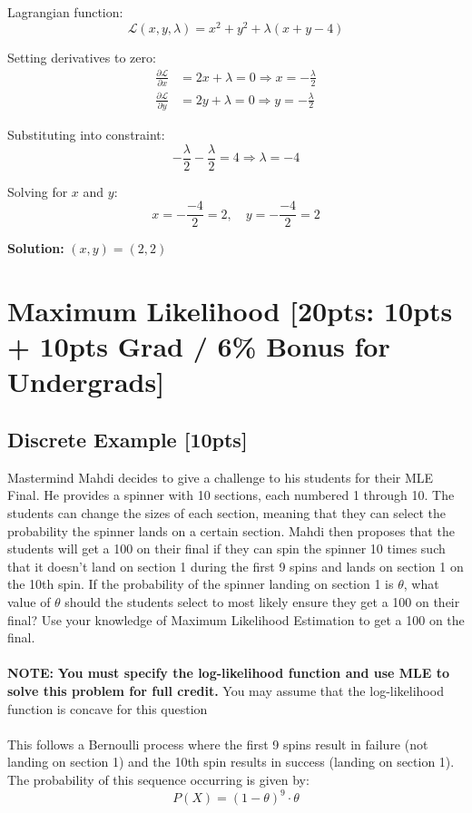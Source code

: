 \documentclass{article}
\begin{document}
Lagrangian function:
\[ \mathcal{L}(x,y,\lambda) = x^2 + y^2 + \lambda (x + y - 4) \]

Setting derivatives to zero:
\begin{align*}
    \frac{\partial \mathcal{L}}{\partial x} &= 2x + \lambda = 0 \Rightarrow x = -\frac{\lambda}{2} \\
    \frac{\partial \mathcal{L}}{\partial y} &= 2y + \lambda = 0 \Rightarrow y = -\frac{\lambda}{2}
\end{align*}

Substituting into constraint:
\[ -\frac{\lambda}{2} - \frac{\lambda}{2} = 4 \Rightarrow \lambda = -4 \]

Solving for $x$ and $y$:
\[ x = -\frac{-4}{2} = 2, \quad y = -\frac{-4}{2} = 2 \]

\textbf{Solution:} $(x, y) = (2,2)$

\newpage
\section{Maximum Likelihood [20pts: 10pts + 10pts Grad / 6\% Bonus for Undergrads]}
\subsection{Discrete Example [10pts]}
Mastermind Mahdi decides to give a challenge to his students for their MLE Final. He provides a spinner with 10 sections, each numbered 1 through 10. The students can change the sizes of each section, meaning that they can select the probability the spinner lands on a certain section. Mahdi then proposes that the students will get a 100 on their final if they can spin the spinner 10 times such that it doesn't land on section 1 during the first 9 spins and lands on section 1 on the 10th spin. If the probability of the spinner landing on section 1 is $\theta$, what value of $\theta$ should the students select to most likely ensure they get a 100 on their final? Use your knowledge of Maximum Likelihood Estimation to get a 100 on the final. \\\\\textbf{NOTE: } \textbf{You must specify the log-likelihood function and use MLE to solve this problem for full credit.} You may assume that the log-likelihood function is concave for this question \\\\

This follows a Bernoulli process where the first 9 spins result in failure (not landing on section 1) and the 10th spin results in success (landing on section 1). The probability of this sequence occurring is given by:
\[
    P(X) = (1 - \theta)^9 \cdot \theta
\]
\end{document}
